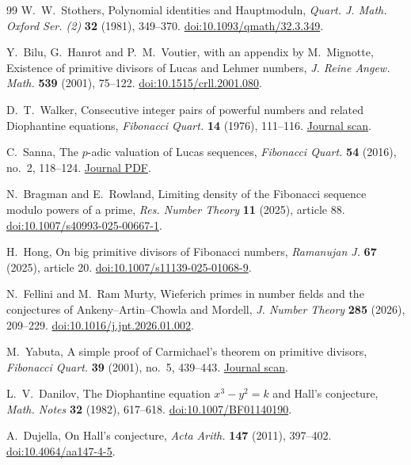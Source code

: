 \documentclass[11pt]{amsart}
\theoremstyle{definition}
\theoremstyle{remark}
\begin{document}
\begin{thebibliography}{99}
W.~W.~Stothers,
Polynomial identities and Hauptmoduln,
\emph{Quart. J. Math. Oxford Ser. (2)} \textbf{32} (1981), 349--370.
\href{https://doi.org/10.1093/qmath/32.3.349}{doi:10.1093/qmath/32.3.349}.

Y.~Bilu, G.~Hanrot and P.~M.~Voutier,
with an appendix by M.~Mignotte,
Existence of primitive divisors of Lucas and Lehmer numbers,
\emph{J. Reine Angew. Math.} \textbf{539} (2001), 75--122.
\href{https://doi.org/10.1515/crll.2001.080}{doi:10.1515/crll.2001.080}.

D.~T.~Walker,
Consecutive integer pairs of powerful numbers and related Diophantine
equations,
\emph{Fibonacci Quart.} \textbf{14} (1976), 111--116.
\href{https://www.fq.math.ca/Scanned/14-2/walker.pdf}{Journal scan}.

C.~Sanna,
The $p$-adic valuation of Lucas sequences,
\emph{Fibonacci Quart.} \textbf{54} (2016), no.~2, 118--124.
\href{https://www.fq.math.ca/Papers1/54-2/Sanna02242016.pdf}{Journal PDF}.

N.~Bragman and E.~Rowland,
Limiting density of the Fibonacci sequence modulo powers of a prime,
\emph{Res. Number Theory} \textbf{11} (2025), article 88.
\href{https://doi.org/10.1007/s40993-025-00667-1}{doi:10.1007/s40993-025-00667-1}.

H.~Hong,
On big primitive divisors of Fibonacci numbers,
\emph{Ramanujan J.} \textbf{67} (2025), article 20.
\href{https://doi.org/10.1007/s11139-025-01068-9}{doi:10.1007/s11139-025-01068-9}.

N.~Fellini and M.~Ram Murty,
Wieferich primes in number fields and the conjectures of
Ankeny--Artin--Chowla and Mordell,
\emph{J. Number Theory} \textbf{285} (2026), 209--229.
\href{https://doi.org/10.1016/j.jnt.2026.01.002}{doi:10.1016/j.jnt.2026.01.002}.

M.~Yabuta,
A simple proof of Carmichael's theorem on primitive divisors,
\emph{Fibonacci Quart.} \textbf{39} (2001), no.~5, 439--443.
\href{https://www.fq.math.ca/Scanned/39-5/yabuta.pdf}{Journal scan}.

L.~V.~Danilov,
The Diophantine equation $x^3-y^2=k$ and Hall's conjecture,
\emph{Math. Notes} \textbf{32} (1982), 617--618.
\href{https://doi.org/10.1007/BF01140190}{doi:10.1007/BF01140190}.

A.~Dujella,
On Hall's conjecture,
\emph{Acta Arith.} \textbf{147} (2011), 397--402.
\href{https://doi.org/10.4064/aa147-4-5}{doi:10.4064/aa147-4-5}.


\end{thebibliography}
\end{document}
